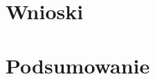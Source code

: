 \documentclass[en, noamssymb]{mgr}
\begin{document}
\chapter{Wnioski} \label{sec:sekcjaWnioski}

\chapter{Podsumowanie}
\label{sec:Podsumowanie}

\end{document}
